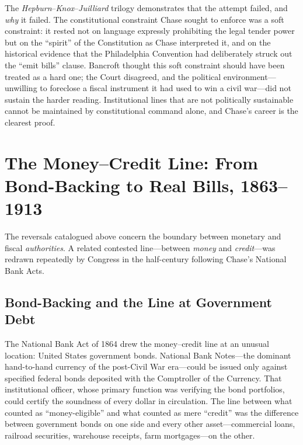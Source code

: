 \documentclass[12pt]{article}
\begin{document}
The \textit{Hepburn}--\textit{Knox}--\textit{Juilliard} trilogy
demonstrates that the attempt failed, and \textit{why} it failed.
The constitutional constraint Chase sought to enforce was a soft
constraint: it rested not on language expressly prohibiting the legal
tender power but on the ``spirit'' of the Constitution as Chase
interpreted it, and on the historical evidence that the Philadelphia
Convention had deliberately struck out the ``emit bills'' clause.
Bancroft thought this soft constraint should have been treated as a
hard one; the Court disagreed, and the political environment---
unwilling to foreclose a fiscal instrument it had used to win a
civil war---did not sustain the harder reading.  Institutional lines
that are not politically sustainable cannot be maintained by
constitutional command alone, and Chase's career is the clearest proof.


\section{The Money--Credit Line: From Bond-Backing to Real Bills,
         1863--1913}
\label{sec:money-credit}

The reversals catalogued above concern the boundary between monetary
and fiscal \emph{authorities}.  A related contested line---between
\emph{money} and \emph{credit}---was redrawn repeatedly by Congress
in the half-century following Chase's National Bank Acts.

\subsection{Bond-Backing and the Line at Government Debt}

The National Bank Act of 1864 drew the money--credit line at an
unusual location: United States government bonds.  National Bank
Notes---the dominant hand-to-hand currency of the post-Civil War
era---could be issued only against specified federal bonds deposited
with the Comptroller of the Currency.  That institutional officer,
whose primary function was verifying the bond portfolios, could
certify the soundness of every dollar in circulation.  The line
between what counted as ``money-eligible'' and what counted as mere
``credit'' was the difference between government bonds on one side and
every other asset---commercial loans, railroad securities, warehouse
receipts, farm mortgages---on the other.
\end{document}

